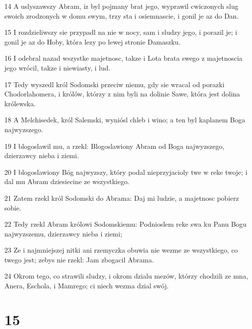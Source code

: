 \par 14 A uslyszawszy Abram, iz byl pojmany brat jego, wyprawil cwiczonych slug swoich zrodzonych w domu swym, trzy sta i osiemnascie, i gonil je az do Dan.
\par 15 I rozdzieliwszy sie przypadl na nie w nocy, sam i sludzy jego, i porazil je; i gonil je az do Hoby, która lezy po lewej stronie Damaszku.
\par 16 I odebral nazad wszystke majetnosc, takze i Lota brata swego z majetnoscia jego wrócil, takze i niewiasty, i lud.
\par 17 Tedy wyszedl król Sodomski przeciw niemu, gdy sie wracal od porazki Chodorlahomera, i królów, którzy z nim byli na dolinie Sawe, która jest dolina królewska.
\par 18 A Melchisedek, król Salemski, wyniósl chleb i wino; a ten byl kaplanem Boga najwyzszego.
\par 19 I blogoslawil mu, a rzekl: Blogoslawiony Abram od Boga najwyzszego, dzierzawcy nieba i ziemi.
\par 20 I blogoslawiony Bóg najwyzszy, który podal nieprzyjacioly twe w reke twoje; i dal mu Abram dziesiecine ze wszystkiego.
\par 21 Zatem rzekl król Sodomski do Abrama: Daj mi ludzie, a majetnosc pobierz sobie.
\par 22 Tedy rzekl Abram królowi Sodomskiemu: Podnioslem reke swa ku Panu Bogu najwyzszemu, dzierzawcy nieba i ziemi;
\par 23 Ze i najmniejszej nitki ani rzemyczka obuwia nie wezme ze wszystkiego, co twego jest; zebys nie rzekl: Jam zbogacil Abrama.
\par 24 Okrom tego, co strawili sludzy, i okrom dzialu mezów, którzy chodzili ze mna, Anera, Eschola, i Mamrego; ci niech wezma dzial swój.

\chapter{15}

